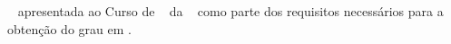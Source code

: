 
%    


\begin{folhadeaprovacao}


\begin{center}
     {\large \imprimirautor}\\
       	\vspace{2cm}	
    \begin{DoubleSpace}    
    {\large \textbf{\MakeUppercase{\imprimirtitulo}}} \\
    {\large \textbf{\MakeUppercase{\imprimirsubtitulo}}}
    \end{DoubleSpace}
		\vspace{1cm}
        
\end{center}		


\begin{flushright} 
    \parbox{0.6\linewidth}{
		\imprimirtipotrabalho~ apresentada ao Curso de \imprimircurso~ da \imprimirinstituicao~ como parte dos
		requisitos necessários para a obtenção do grau em \imprimirgrau. \\}
   \end{flushright} 


\end{folhadeaprovacao}
